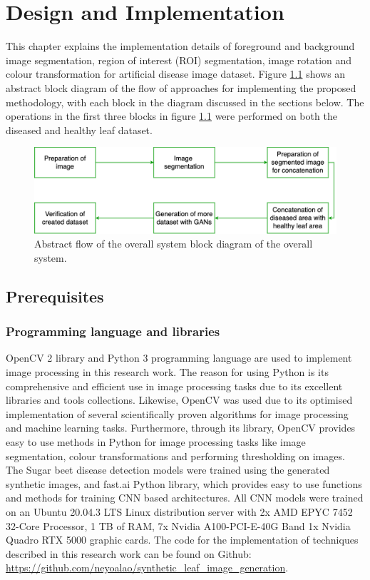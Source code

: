 \chapter{Design and Implementation}\label{cha:DesignImplementation}
This chapter explains the implementation details of foreground and background image segmentation, region of interest (ROI) segmentation, image rotation and colour transformation for artificial disease image dataset. Figure \ref{fig:my_abs_block} shows an abstract block diagram of the flow of approaches for implementing the proposed methodology, with each block in the diagram discussed in the sections below. 
The operations in the first three blocks in figure \ref{fig:my_abs_block} were performed on both the diseased and healthy leaf dataset.
\begin{figure}[!htb]
    \includegraphics[scale=0.4, keepaspectratio]{Figures/block_diagram v2.png}
    \caption{Abstract flow of the overall system block diagram of the overall system.}
    \label{fig:my_abs_block}
\end{figure}

\section{Prerequisites}
\subsection*{Programming language and libraries}
OpenCV 2 library and Python 3 programming language are used to implement image processing in this research work. The reason for using Python is its comprehensive and efficient use in image processing tasks due to its excellent libraries and tools collections. Likewise, OpenCV was used due to its optimised implementation of several scientifically proven algorithms for image processing and machine learning tasks. Furthermore, through its library, OpenCV provides easy to use methods in Python for image processing tasks like image segmentation, colour transformations and performing thresholding on images. The Sugar beet disease detection models were trained using the generated synthetic images, and fast.ai \cite{howard2018fastai} Python library, which provides easy to use functions and methods for training CNN based architectures.
All CNN models were trained on an Ubuntu 20.04.3 LTS Linux distribution server with 2x AMD EPYC 7452 32-Core Processor, 1 TB of RAM, 7x Nvidia A100-PCI-E-40G Band 1x Nvidia Quadro RTX 5000 graphic cards.
The code for the implementation of techniques described in this research work can be found on Github: \url{https://github.com/neyoalao/synthetic_leaf_image_generation}.

